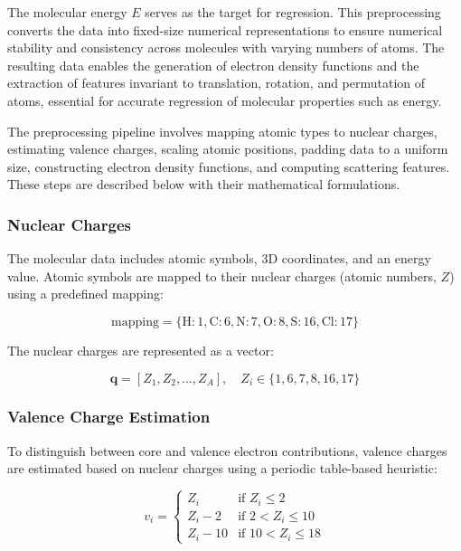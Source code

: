 \documentclass{article}
\begin{document}
\vspace{0.2cm}

The molecular energy $E$ serves as the target for regression. This preprocessing converts the data into fixed-size numerical representations to ensure numerical stability and consistency across molecules with varying numbers of atoms. The resulting data enables the generation of electron density functions and the extraction of features invariant to translation, rotation, and permutation of atoms, essential for accurate regression of molecular properties such as energy. \newline

The preprocessing pipeline involves mapping atomic types to nuclear charges, estimating valence charges, scaling atomic positions, padding data to a uniform size, constructing electron density functions, and computing scattering features. These steps are described below with their mathematical formulations. \newline

\subsubsection{Nuclear Charges}

The molecular data includes atomic symbols, 3D coordinates, and an energy value. Atomic symbols are mapped to their nuclear charges (atomic numbers, $Z$) using a predefined mapping:

\[
\text{mapping} = \{ \text{H}: 1, \text{C}: 6, \text{N}: 7, \text{O}: 8, \text{S}: 16, \text{Cl}: 17 \}
\]

The nuclear charges are represented as a vector:

\[
\mathbf{q} = [Z_1, Z_2, \ldots, Z_A], \quad Z_i \in \{1, 6, 7, 8, 16, 17\}
\]


\subsubsection{Valence Charge Estimation}

To distinguish between core and valence electron contributions, valence charges are estimated based on nuclear charges using a periodic table-based heuristic:

\[
v_i =
\begin{cases}
Z_i & \text{if } Z_i \leq 2 \\
Z_i - 2 & \text{if } 2 < Z_i \leq 10 \\
Z_i - 10 & \text{if } 10 < Z_i \leq 18
\end{cases}
\]
\end{document}
